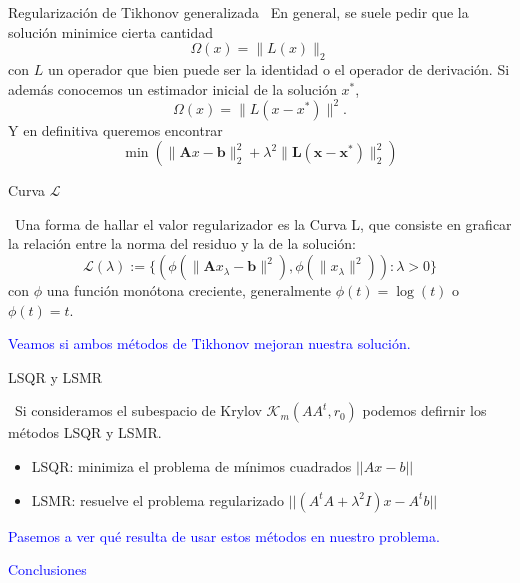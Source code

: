 \documentclass[12pt]{beamer}
\begin{document}
	\begin{frame}{Regularización de Tikhonov generalizada}
		\ En general, se suele pedir que la solución minimice cierta cantidad 
		\[
		\Omega(x) = \| L(x) \|_2
		\] con $L$ un operador que bien puede ser la identidad o el operador de derivación. Si además conocemos un estimador inicial de la solución $x^*$, $$\Omega(x) = \| L(x - x^*) \|^2.$$ Y en definitiva queremos encontrar $$\min \left( \| \mathbf{A}x - \mathbf{b} \|_2^2 + \lambda^2 \| \mathbf{L(x - x^*)} \|_2^2 \right)$$
		
		
	\end{frame}
	
	\begin{frame}{Curva $\mathcal{L}$}
		
		\ Una forma de hallar el valor regularizador es la Curva L, que consiste en graficar la relación entre la norma del residuo y la de la solución: $$\mathcal{L}(\lambda) := \{(\phi (\| \mathbf{A}x_\lambda - \mathbf{b} \|^2),\phi (\| x_\lambda  \|^2) ): \lambda > 0\}$$ con $\phi$ una función monótona creciente, generalmente $\phi(t) = \log(t)$ o $\phi(t) = t$.
		
	\end{frame}
	
	\begin{frame}
		
		\textcolor{blue}{\Large Veamos si ambos métodos de Tikhonov mejoran nuestra solución.}
		
	\end{frame}
	
	
	
	
	
	\begin{frame}{LSQR y LSMR}
		
		\ Si consideramos el subespacio de Krylov $\mathcal{K}_m (AA^t, r_0)$ podemos defirnir los métodos LSQR y LSMR.
		\begin{itemize}
			\item LSQR: minimiza el problema de mínimos cuadrados $||Ax-b||$
			\item LSMR: resuelve el problema regularizado $||(A^tA+\lambda ^2 I)x-A^tb||$
		\end{itemize}
		
	\end{frame}
	
	\begin{frame}
		
		\textcolor{blue}{\Large Pasemos a ver qué resulta de usar estos métodos en nuestro problema.}
		
	\end{frame}
	
	\begin{frame}
		
		\textcolor{blue}{\huge Conclusiones}
		
	\end{frame}
	
\end{document}
